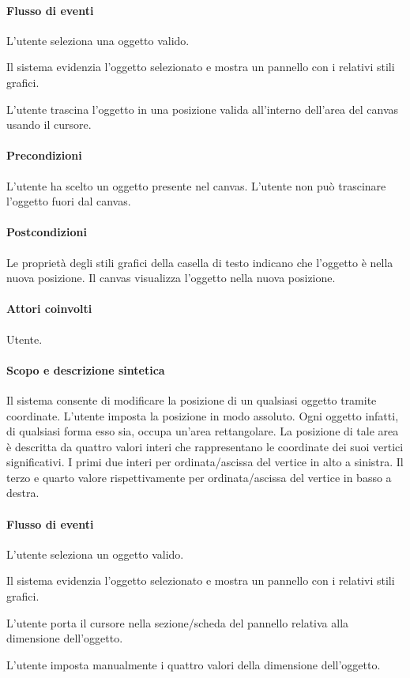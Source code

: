\paragraph{Flusso di eventi}
\begin{elenconumerato}[\textbf{}]{\subsubsecindent}
\item L'utente seleziona una oggetto valido.
\item Il sistema evidenzia l'oggetto selezionato e mostra un pannello con i relativi stili grafici.
\item L'utente trascina l'oggetto in una posizione valida all'interno dell'area del canvas usando il cursore.
\end{elenconumerato}
\paragraph{Precondizioni} L'utente ha scelto un oggetto presente nel canvas. L'utente non pu\` o trascinare l'oggetto fuori dal canvas.
\paragraph{Postcondizioni} Le propriet\` a degli stili grafici della casella di testo indicano che l'oggetto \` e nella nuova posizione. Il canvas visualizza l'oggetto nella nuova posizione.
 

\paragraph{Attori coinvolti} Utente.
\paragraph{Scopo e descrizione sintetica}   Il sistema consente di modificare la posizione di un qualsiasi oggetto tramite coordinate.  L'utente  imposta la posizione in modo assoluto. Ogni oggetto infatti, di qualsiasi forma esso sia, occupa un'area rettangolare. La posizione di tale area \`e descritta da quattro valori interi che rappresentano le coordinate dei suoi vertici significativi. I primi due interi per ordinata/ascissa del vertice in alto a sinistra. Il terzo e quarto valore rispettivamente per ordinata/ascissa del vertice in basso a destra.
\paragraph{Flusso di eventi}
\begin{elenconumerato}[\textbf{}]{\subsubsecindent}
\item  L'utente seleziona un oggetto valido.
\item  Il sistema evidenzia l'oggetto selezionato e mostra un pannello con i relativi stili grafici.
\item  L'utente porta  il cursore nella sezione/scheda del pannello relativa alla dimensione dell'oggetto.
\item  L'utente imposta manualmente i quattro valori della dimensione dell'oggetto.
\end{elenconumerato}
